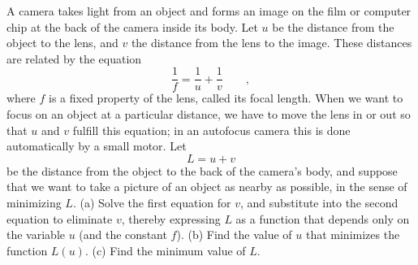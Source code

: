 A camera takes light from an object and forms an image on the
film or computer chip at the back of the camera inside its body. Let $u$ be the distance
from the object to the lens, and $v$ the distance from the lens
to the image. These distances are related by the equation
\begin{equation*}
  \frac{1}{f} = \frac{1}{u}+\frac{1}{v} \qquad ,
\end{equation*}
where $f$ is a fixed property of the lens, called its focal length.
When we want to focus on an object at a particular distance,
we have to move the lens in or out so that $u$ and $v$ fulfill
this equation; in an autofocus camera this is done automatically
by a small motor. Let
\begin{equation*}
  L = u+v
\end{equation*}
be the distance from the object to the back of the camera's body,
and suppose that we want to take a picture of an object as nearby
as possible, in the sense of minimizing $L$.\hwendpart
(a) Solve the first equation for $v$, and substitute into the
second equation to eliminate $v$, thereby expressing $L$ as a function
that depends only on the variable $u$ (and the constant $f$).\answercheck\hwendpart
(b) Find the value of $u$ that minimizes the function $L(u)$.\answercheck\hwendpart
(c) Find the minimum value of $L$.\answercheck\hwendpart
